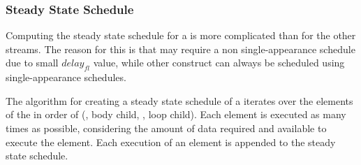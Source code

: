 \begin{comment}
In our example, $e^i_{fl} = o^i_{fl} = 3 * 2 = 6$ and $u^i_{fl} =
3 * 3 = 9$.  Note that the {\feedbackloop} pushes data out during
its initialization.

Finally, we compute the amount of data present in {{\Channels}} after
initialization. These amounts are important because they will be
used to compute the steady state schedule of the {\feedbackloop}.
These amounts were not necessary for computation of steady state
schedules of {\pipeline} and {\splitjoin}. These amounts are
calculated by simply subtracting the amount of data popped from a
{{\Channel}} from amount of data pushed into a {{\Channel}}. Here we
adopted the notation for
{\Input} and {\Output} {{\Channel}} from Section \ref{sec:exec-model}.

\begin{displaymath}
\begin{array}{rl}
in^i_B = & l_j * u_j - l_B * o_{fl_B} \\
out^i_B = & u^i_{fl_B} + l_B * u_{fl_B} - l_s * o_s\\
in^i_L = & l_s * w_{s, 1} - l_L * o_{fl_L} \\
out^i_L = & delay_{fl} + u^i_{fl_L} + l_L * u_{fl_L} - l_j * w_{j,1} \\
\end{array}
\end{displaymath}
\end{comment}

\subsubsection{Steady State Schedule}

Computing the steady state schedule for a {\feedbackloop} is more
complicated than for the other streams.  The reason for this is
that {\feedbackloops} may require a non single-appearance schedule
due to small $delay_{fl}$ value, while other {\StreamIt} construct
can always be scheduled using single-appearance schedules.

\begin{comment}
The algorithm used for creating of a steady state schedule
will work in several phases.  The amount of data present in
{{\Channels}} between the children of the {\feedbackloop}, the
{\joiner} and the {\splitter} is kept track of to determine which
element is allowed to execute.
\end{comment}

The algorithm for creating a steady state schedule of a
{\feedbackloop} iterates over the elements of the {\feedbackloop}
in order of ({\joiner}, body child, {\splitter}, loop child). Each
element is executed as many times as possible, considering the
amount of data required and available to execute the element. Each
execution of an element is appended to the steady state schedule.

